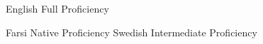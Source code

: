 
\begin{cvskills}

  \cvskill
    {English} %
    {Full Proficiency} %

  \cvskill
    {Farsi} %
    {Native Proficiency} %
  \cvskill
    {Swedish} %
    {Intermediate Proficiency} %
    
\end{cvskills}
